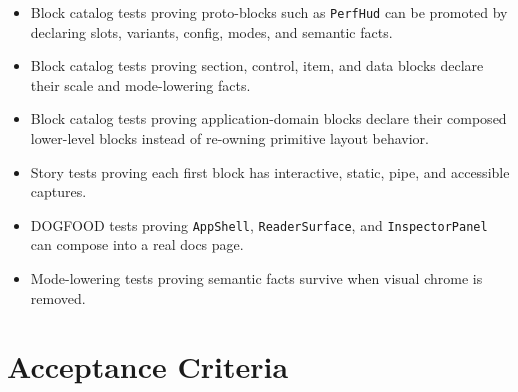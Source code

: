 \begin{itemize}
\item
  Block catalog tests proving proto-blocks such as \texttt{P\allowbreak{}e\allowbreak{}r\allowbreak{}f\allowbreak{}H\allowbreak{}u\allowbreak{}d} can be promoted by declaring slots, variants, config, modes, and semantic facts.
\item
  Block catalog tests proving section, control, item, and data blocks declare their scale and mode-lowering facts.
\item
  Block catalog tests proving application-domain blocks declare their composed lower-level blocks instead of re-owning primitive layout behavior.
\item
  Story tests proving each first block has interactive, static, pipe, and accessible captures.
\item
  DOGFOOD tests proving \texttt{A\allowbreak{}p\allowbreak{}p\allowbreak{}S\allowbreak{}h\allowbreak{}e\allowbreak{}l\allowbreak{}l}, \texttt{R\allowbreak{}e\allowbreak{}a\allowbreak{}d\allowbreak{}e\allowbreak{}r\allowbreak{}S\allowbreak{}u\allowbreak{}r\allowbreak{}f\allowbreak{}a\allowbreak{}c\allowbreak{}e}, and \texttt{I\allowbreak{}n\allowbreak{}s\allowbreak{}p\allowbreak{}e\allowbreak{}c\allowbreak{}t\allowbreak{}o\allowbreak{}r\allowbreak{}P\allowbreak{}a\allowbreak{}n\allowbreak{}e\allowbreak{}l} can compose into a real docs page.
\item
  Mode-lowering tests proving semantic facts survive when visual chrome is removed.
\end{itemize}

\section{Acceptance Criteria}\label{record-128-acceptance-criteria}


